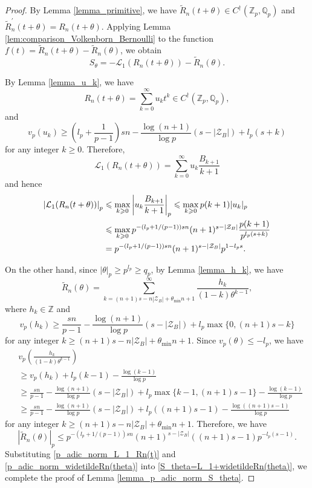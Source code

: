 \documentclass[12pt]{article}
\numberwithin{equation}{section}
\begin{document}
\begin{proof}
By Lemma \ref{lemma_primitive}, we have $\widetilde{R}_n(t+\theta) \in C^\dagger(\mathbb{Z}_p,\mathbb{Q}_p)$ and $\widetilde{R}_n^{\prime}(t+\theta) = R_n(t+\theta)$. Applying Lemma \ref{lem:comparison_Volkenborn_Bernoulli} to the function $f(t) = \widetilde{R}_n(t+\theta) - \widetilde{R}_n(\theta)$, we obtain
\begin{equation}\label{S_theta=L_1+widetildeRn(theta)}
S_{\theta} = -\mathcal{L}_1(R_n(t+\theta)) - \widetilde{R}_n(\theta).
\end{equation}

By Lemma \ref{lemma_u_k}, we have 
\[
 R_n(t+\theta) = \sum_{k=0}^{\infty} u_k t^{k} \in C^\dagger(\mathbb{Z}_p,\mathbb{Q}_p), 
\]
and
\[ v_p(u_k) \geqslant \left( l_p + \frac{1}{p-1} \right)sn - \frac{\log(n+1)}{\log p}(s-|\mathcal{Z}_B|) +l_p(s+k) \]
for any integer $k \geqslant 0$. Therefore,
\[ \mathcal{L}_1(R_n(t+\theta)) = \sum_{k=0}^{\infty} u_k\frac{B_{k+1}}{k+1} \]
and hence
\begin{align}
	\left| \mathcal{L}_1(R_n(t+\theta)) \right|_p &\leqslant \max_{k \geqslant 0} \left| u_k\frac{B_{k+1}}{k+1}  \right|_p \leqslant \max_{k \geqslant 0}  p(k+1)|u_k|_p  \notag\\
	&\leqslant \max_{k \geqslant 0} p^{-(l_p+1/(p-1))sn}(n+1)^{s-|\mathcal{Z}_B|}\frac{p(k+1)}{p^{l_p(s+k)}} \notag\\
	&= p^{-(l_p+1/(p-1))sn}(n+1)^{s-|\mathcal{Z}_B|} p^{1-l_ps}. \label{p_adic_norm_L_1_Rn(t)}
\end{align}

On the other hand, since $|\theta|_p \geqslant p^{l_p} \geqslant q_p$, by Lemma \ref{lemma_h_k}, we have
\[ \widetilde{R}_n(\theta) = \sum_{k=(n+1)s-n|\mathcal{Z}_B|+\theta_{\min}n+1}^{\infty} \frac{h_{k}}{(1-k)\theta^{k-1}}, \]
where $h_k \in \mathbb{Z}$ and
\[ v_p(h_k) \geqslant \frac{sn}{p-1}-\frac{\log(n+1)}{\log p}(s-|\mathcal{Z}_B|) + l_p\max\{0,(n+1)s-k\} \]
for any integer $k \geqslant (n+1)s-n|\mathcal{Z}_B|+\theta_{\min}n+1$. Since $v_p(\theta) \leqslant -l_p$, we have
\begin{align*}
 &v_p\left( \frac{h_{k}}{(1-k)\theta^{k-1}} \right) \\
 &\geqslant v_p(h_k) + l_p(k-1) - \frac{\log(k-1)}{\log p} \\
 &\geqslant \frac{sn}{p-1}-\frac{\log(n+1)}{\log p}(s-|\mathcal{Z}_B|) + l_p\max\{k-1,(n+1)s-1\} - \frac{\log(k-1)}{\log p} \\
 &\geqslant  \frac{sn}{p-1}-\frac{\log(n+1)}{\log p}(s-|\mathcal{Z}_B|) + l_p((n+1)s-1) - \frac{\log((n+1)s-1)}{\log p}
\end{align*}
for any integer $k\geqslant (n+1)s-n|\mathcal{Z}_B|+\theta_{\min}n+1$. Therefore, we have
\begin{equation}\label{p_adic_norm_widetildeRn(theta)}
	|\widetilde{R}_n(\theta)|_p \leqslant p^{-(l_p+1/(p-1))sn}(n+1)^{s-|\mathcal{Z}_B|}((n+1)s-1) p^{-l_p(s-1)}.
\end{equation}
Substituting \eqref{p_adic_norm_L_1_Rn(t)} and \eqref{p_adic_norm_widetildeRn(theta)} into \eqref{S_theta=L_1+widetildeRn(theta)}, we complete the proof of Lemma \ref{lemma_p_adic_norm_S_theta}.
\end{proof}
\end{document}
